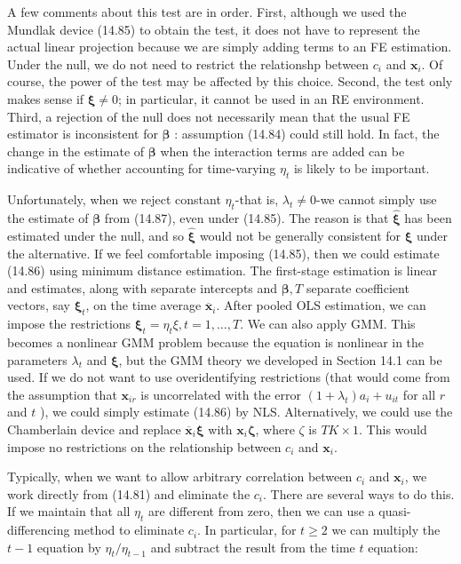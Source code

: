 \documentclass[10pt]{article}
\begin{document}
A few comments about this test are in order. First, although we used the Mundlak device (14.85) to obtain the test, it does not have to represent the actual linear projection because we are simply adding terms to an FE estimation. Under the null, we do not need to restrict the relationshp between $c_{i}$ and $\mathbf{x}_{i}$. Of course, the power of the test may be affected by this choice. Second, the test only makes sense if $\boldsymbol{\xi} \neq 0$; in particular, it cannot be used in an RE environment. Third, a rejection of the null does not necessarily mean that the usual FE estimator is inconsistent for $\boldsymbol{\beta}$ : assumption (14.84) could still hold. In fact, the change in the estimate of $\boldsymbol{\beta}$ when the interaction terms are added can be indicative of whether accounting for time-varying $\eta_{t}$ is likely to be important.

Unfortunately, when we reject constant $\eta_{t}$-that is, $\lambda_{t} \neq 0$-we cannot simply use the estimate of $\boldsymbol{\beta}$ from (14.87), even under (14.85). The reason is that $\hat{\boldsymbol{\xi}}$ has been estimated under the null, and so $\hat{\boldsymbol{\xi}}$ would not be generally consistent for $\boldsymbol{\xi}$ under the alternative. If we feel comfortable imposing (14.85), then we could estimate (14.86) using minimum distance estimation. The first-stage estimation is linear and estimates, along with separate intercepts and $\boldsymbol{\beta}, T$ separate coefficient vectors, say $\boldsymbol{\xi}_{t}$, on the time average $\overline{\mathbf{x}}_{i}$. After pooled OLS estimation, we can impose the restrictions $\boldsymbol{\xi}_{t}= \eta_{t} \xi, t=1, \ldots, T$. We can also apply GMM. This becomes a nonlinear GMM problem because the equation is nonlinear in the parameters $\lambda_{t}$ and $\boldsymbol{\xi}$, but the GMM theory we developed in Section 14.1 can be used. If we do not want to use overidentifying restrictions (that would come from the assumption that $\mathbf{x}_{i r}$ is uncorrelated with the error $\left(1+\lambda_{t}\right) a_{i}+u_{i t}$ for all $r$ and $t$ ), we could simply estimate (14.86) by NLS. Alternatively, we could use the Chamberlain device and replace $\overline{\mathbf{x}}_{i} \boldsymbol{\xi}$ with $\mathbf{x}_{i} \boldsymbol{\zeta}$, where $\zeta$ is $T K \times 1$. This would impose no restrictions on the relationship between $c_{i}$ and $\mathbf{x}_{i}$.

Typically, when we want to allow arbitrary correlation between $c_{i}$ and $\mathbf{x}_{i}$, we work directly from (14.81) and eliminate the $c_{i}$. There are several ways to do this. If we maintain that all $\eta_{t}$ are different from zero, then we can use a quasi-differencing method to eliminate $c_{i}$. In particular, for $t \geq 2$ we can multiply the $t-1$ equation by $\eta_{t} / \eta_{t-1}$ and subtract the result from the time $t$ equation:
\end{document}
